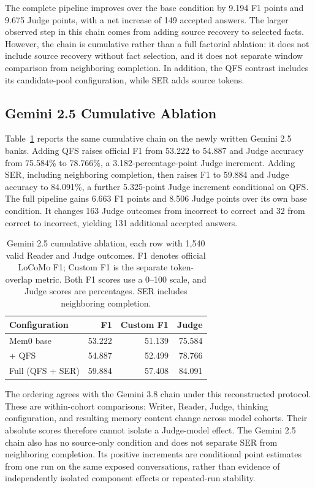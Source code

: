 \documentclass[11pt]{article}
\newcommand{\qfs}{\textsc{QFS}}
\newcommand{\ser}{\textsc{SER}}
\begin{document}
The complete pipeline improves over the base condition by 9.194 F1 points and 9.675 Judge points, with a net increase of 149 accepted answers. The larger observed step in this chain comes from adding source recovery to selected facts. However, the chain is cumulative rather than a full factorial ablation: it does not include source recovery without fact selection, and it does not separate window comparison from neighboring completion. In addition, the \qfs{} contrast includes its candidate-pool configuration, while \ser{} adds source tokens.

\subsection{Gemini 2.5 Cumulative Ablation}
\label{sec:gemini25}
Table~\ref{tab:gemini25} reports the same cumulative chain on the newly written Gemini 2.5 banks. Adding \qfs{} raises official F1 from 53.222 to 54.887 and Judge accuracy from 75.584\% to 78.766\%, a 3.182-percentage-point Judge increment. Adding \ser{}, including neighboring completion, then raises F1 to 59.884 and Judge accuracy to 84.091\%, a further 5.325-point Judge increment conditional on \qfs{}. The full pipeline gains 6.663 F1 points and 8.506 Judge points over its own base condition. It changes 163 Judge outcomes from incorrect to correct and 32 from correct to incorrect, yielding 131 additional accepted answers.

\begin{table}[t]
\centering
\small
\begin{tabular}{lrrr}
\toprule
Configuration & F1 & Custom F1 & Judge\\
\midrule
Mem0 base & 53.222 & 51.139 & 75.584\\
+ \qfs{} & 54.887 & 52.499 & 78.766\\
Full (\qfs{} + \ser{}) & 59.884 & 57.408 & 84.091\\
\bottomrule
\end{tabular}
\caption{Gemini 2.5 cumulative ablation, each row with 1,540 valid Reader and Judge outcomes. F1 denotes official LoCoMo F1; Custom F1 is the separate token-overlap metric. Both F1 scores use a 0--100 scale, and Judge scores are percentages. \ser{} includes neighboring completion.}
\label{tab:gemini25}
\end{table}

The ordering agrees with the Gemini 3.8 chain under this reconstructed protocol. These are within-cohort comparisons: Writer, Reader, Judge, thinking configuration, and resulting memory content change across model cohorts. Their absolute scores therefore cannot isolate a Judge-model effect. The Gemini 2.5 chain also has no source-only condition and does not separate \ser{} from neighboring completion. Its positive increments are conditional point estimates from one run on the same exposed conversations, rather than evidence of independently isolated component effects or repeated-run stability.
\end{document}
